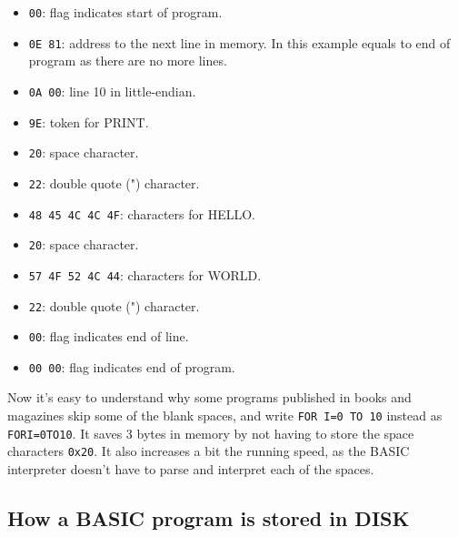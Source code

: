     \begin{itemize}
        \item \texttt{00}: flag indicates start of program.
        \item \texttt{0E 81}: address to the next line in memory. In this
        example equals to end of program as there are no more lines.
        \item \texttt{0A 00}: line 10 in little-endian.
        \item \texttt{9E}: token for PRINT.
        \item \texttt{20}: space character.
        \item \texttt{22}: double quote (") character.
        \item \texttt{48 45 4C 4C 4F}: characters for HELLO.
        \item \texttt{20}: space character.
        \item \texttt{57 4F 52 4C 44}: characters for WORLD.
        \item \texttt{22}: double quote (") character.
        \item \texttt{00}: flag indicates end of line.
        \item \texttt{00 00}: flag indicates end of program.
    \end{itemize}

    Now it's easy to understand why some programs published in books and
    magazines skip some of the blank spaces, and write \texttt{FOR I=0 TO 10}
    instead as \texttt{FORI=0TO10}. It saves 3 bytes in memory by not having to
    store the space characters \texttt{0x20}. It also increases a bit the
    running speed, as the BASIC interpreter doesn't have to parse and interpret
    each of the spaces.

    \subsection{How a BASIC program is stored in DISK}

